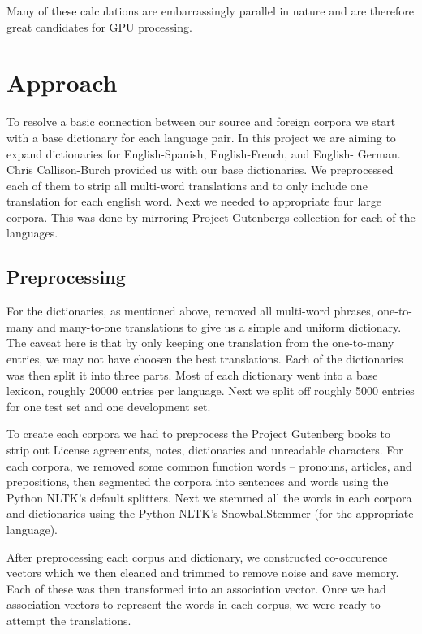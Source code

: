 \documentclass[12pt]{article}
\begin{document}
Many of these calculations are embarrassingly parallel in nature and are therefore great candidates for GPU processing.


\section{Approach}

To resolve a basic connection between our source and foreign corpora we start with a base dictionary for each language pair. In this project we are aiming to expand dictionaries for English-Spanish, English-French, and English-
German. Chris Callison-Burch provided us with our base dictionaries. We preprocessed each of them to strip all multi-word translations and to only include one translation for each english word. Next we needed to appropriate four large corpora. This was done by mirroring Project Gutenbergs collection for each of the languages.

\subsection{Preprocessing}

For the dictionaries, as mentioned above, removed all multi-word phrases, one-to-many and many-to-one translations to give us a simple and uniform dictionary. The caveat here is that by only keeping one translation from the one-to-many entries, we may not have choosen the best translations. Each of the dictionaries was then split it into three parts. Most of each dictionary went into a base lexicon, roughly 20000 entries per language. Next we split off roughly 5000 entries for one test set and one development set.

To create each corpora we had to preprocess the Project Gutenberg books to strip out License agreements, notes, dictionaries and unreadable characters. For each corpora, we removed some common function words -- pronouns, articles,
and prepositions, then segmented the corpora into sentences and words using the Python NLTK's default splitters. Next we stemmed all the words in each corpora and dictionaries using the Python NLTK's SnowballStemmer (for the appropriate
language).

After preprocessing each corpus and dictionary, we constructed co-occurence vectors which we then cleaned and trimmed to remove noise and save memory. Each of these was then transformed into an association vector. Once we had association vectors to represent the words in each corpus, we were ready to attempt the translations.
\end{document}
